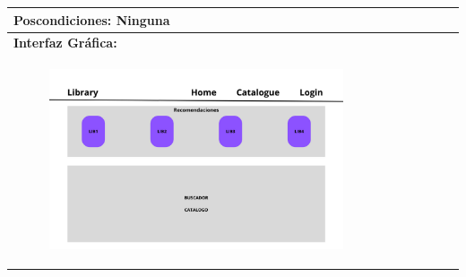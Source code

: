 \documentclass{report}
\begin{document}
\begin{center}
\begin{longtable}{|p{\linewidth}|}
                        \textbf{Poscondiciones:} Ninguna\\
                        \hline
                        \textbf{Interfaz Gráfica:}\\
                        \begin{figure}[H]
                            \centering
                            \includegraphics[width=0.8\textwidth]{./img/grafico/recom_lib.png}
                        \end{figure}\\
                        \hline
                    \end{longtable}
                \end{center}
                \clearpage
\end{document}
